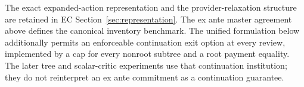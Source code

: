 The exact expanded-action representation and the provider-relaxation structure are retained in EC Section~\ref{sec:representation}. The ex ante master agreement above defines the canonical inventory benchmark. The unified formulation below additionally permits an enforceable continuation exit option at every review, implemented by a cap for every nonroot subtree and a root payment equality. The later tree and scalar-critic experiments use that continuation institution; they do not reinterpret an ex ante commitment as a continuation guarantee.
